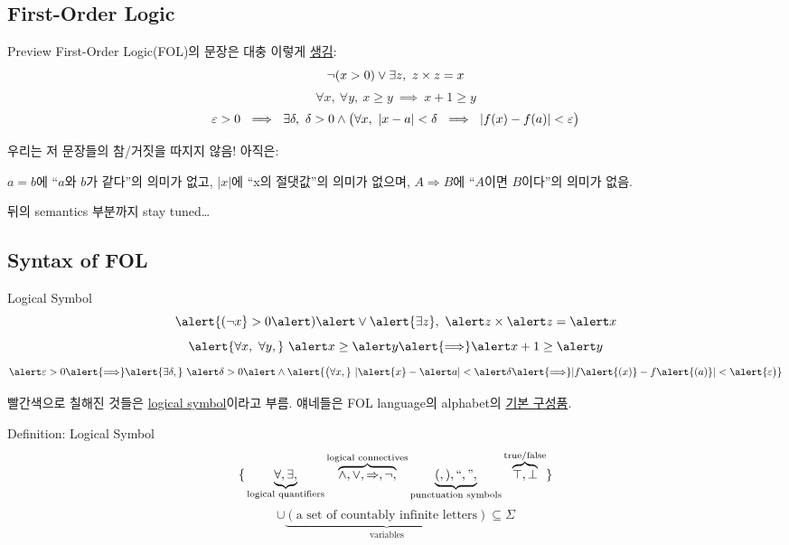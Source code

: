 \documentclass[../231120_msquare_computational-logic.tex]{subfiles}
\begin{document}
\subsection{First-Order Logic}
\begin{frame}{Preview}
    First-Order Logic(FOL)의 문장은 대충 이렇게 \ul{생김}:
    \[
        \lnot(x > 0) \lor \exs z,\ z \times z = x
    \]
    \[
        \forall x,\  \forall y,\  x \ge y \ \implies\ x + 1 \ge y
    \]
    \[
        \veps > 0 \ \implies\  \exs \delta,\ \delta > 0 \land
        \big(\fall x,\  |x-a| < \delta \ \implies\ |f(x)-f(a)| < \veps\big)
    \]
    \pause

    \begin{alertblock}{}
        우리는 저 문장들의 \alert{참/거짓을 따지지 않음}! 아직은:
        \begin{itemize}
            \ii \(a = b\)에 ``\(a\)와 \(b\)가 같다''의 의미가 \alert{없고},
            \ii \(|x|\)에 ``x의 절댓값''의 의미가 \alert{없으며},
            \ii \(A \Rightarrow B\)에 ``\(A\)이면 \(B\)이다''의 의미가 \alert{없음}.
        \end{itemize}
        뒤의 semantics 부분까지 stay tuned\ldots
    \end{alertblock}
\end{frame}

\subsection{Syntax of FOL}
\begin{frame}{Logical Symbol}
    \[
        \alert{(\lnot x} > 0\alert) \alert\lor \alert{\exs z},\ \alert z \times \alert z = \alert x
    \]
    \[
        \alert{\forall x,\ \forall y,}\  \alert x \ge \alert y \alert{\Longrightarrow} \alert x + 1 \ge \alert y
    \]
    \[
        \alert\veps > 0 \alert{\Longrightarrow}  \alert{\exs \delta,}\  \alert\delta > 0 \alert\land
        \alert{\big(\fall x,}\  |\alert{x}-\alert a| < \alert \delta \alert{\Longrightarrow}
        |f\alert{(x)}-f\alert{(a)}| < \alert{\veps\big)}
    \]

    빨간색으로 칠해진 것들은 \ul{logical symbol}이라고 부름.
    얘네들은 FOL language의 alphabet의 \ul{기본 구성품}.

    \begin{block}{Definition: Logical Symbol}
    \[
        \{\,
            \underbrace{\forall, \exists,}_\text{logical quantifiers}
            \overbrace{\land, \lor, \Rightarrow, \lnot,}^\text{logical connectives}
            \underbrace{(, ), ``," ,}_\text{punctuation symbols}
            \overbrace{\top, \bot}^\text{true/false}
        \}
    \]
    \[
        \cup \underbrace{(\text{a set of countably infinite letters})}_\text{variables}
        \subseteq \Sigma
    \]
    \end{block}
\end{frame}
\end{document}
